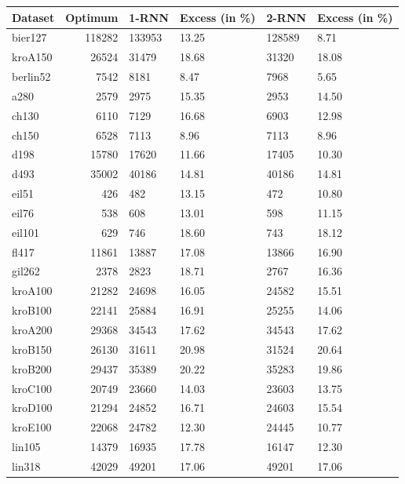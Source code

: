 \begin{figure}[ht]
	\centering
	\begin{minipage}{\linewidth}
		\centering
		\begin{tabular*}{\textwidth}{l||r|| l | l || l | l }
			Dataset & Optimum & 1-RNN & Excess (in \%) & 2-RNN & Excess (in \%) \\
			\hline\hline
			bier127  & 118282 & 133953 & 13.25 & 128589 & 8.71  \\
			kroA150  & 26524  & 31479  & 18.68 & 31320  & 18.08 \\
			berlin52 & 7542   & 8181   & 8.47  & 7968   & 5.65  \\
			a280     & 2579   & 2975   & 15.35 & 2953   & 14.50 \\
			ch130    & 6110   & 7129   & 16.68 & 6903   & 12.98 \\
			ch150    & 6528   & 7113   & 8.96  & 7113   & 8.96  \\
			d198     & 15780  & 17620  & 11.66 & 17405  & 10.30 \\
			d493     & 35002  & 40186  & 14.81 & 40186  & 14.81 \\
			eil51    & 426    & 482    & 13.15 & 472    & 10.80 \\
			eil76    & 538    & 608    & 13.01 & 598    & 11.15 \\
			eil101   & 629    & 746    & 18.60 & 743    & 18.12 \\
			fl417    & 11861  & 13887  & 17.08 & 13866  & 16.90 \\
			gil262   & 2378   & 2823   & 18.71 & 2767   & 16.36 \\
			kroA100  & 21282  & 24698  & 16.05 & 24582  & 15.51 \\
			kroB100  & 22141  & 25884  & 16.91 & 25255  & 14.06 \\
			kroA200  & 29368  & 34543  & 17.62 & 34543  & 17.62 \\
			kroB150  & 26130  & 31611  & 20.98 & 31524  & 20.64 \\
			kroB200  & 29437  & 35389  & 20.22 & 35283  & 19.86 \\
			kroC100  & 20749  & 23660  & 14.03 & 23603  & 13.75 \\
			kroD100  & 21294  & 24852  & 16.71 & 24603  & 15.54 \\
			kroE100  & 22068  & 24782  & 12.30 & 24445  & 10.77 \\
			lin105   & 14379  & 16935  & 17.78 & 16147  & 12.30 \\
			lin318   & 42029  & 49201  & 17.06 & 49201  & 17.06 \\

\end{tabular*}
\end{minipage}
\end{figure}

